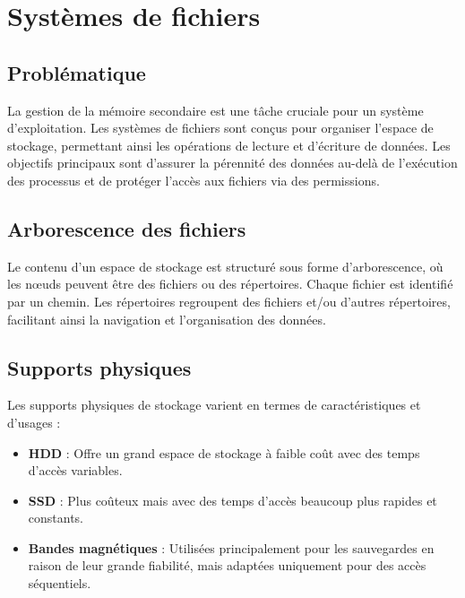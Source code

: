 \section{Systèmes de fichiers}\label{sec:systemesdefichiers}

\subsection{Problématique}
La gestion de la mémoire secondaire est une tâche cruciale pour un système d'exploitation. 
Les systèmes de fichiers sont conçus pour organiser l'espace de stockage, permettant ainsi les opérations de lecture et d'écriture de données. 
Les objectifs principaux sont d'assurer la pérennité des données au-delà de l'exécution des processus et de protéger l'accès aux fichiers via des permissions.

\subsection{Arborescence des fichiers}
Le contenu d'un espace de stockage est structuré sous forme d'arborescence, où les nœuds peuvent être des fichiers ou des répertoires. 
Chaque fichier est identifié par un chemin. 
Les répertoires regroupent des fichiers et/ou d'autres répertoires, facilitant ainsi la navigation et l'organisation des données.

\subsection{Supports physiques}
Les supports physiques de stockage varient en termes de caractéristiques et d'usages :
\begin{itemize}
    \item \textbf{HDD} : Offre un grand espace de stockage à faible coût avec des temps d'accès variables.
    \item \textbf{SSD} : Plus coûteux mais avec des temps d'accès beaucoup plus rapides et constants.
    \item \textbf{Bandes magnétiques} : Utilisées principalement pour les sauvegardes en raison de leur grande fiabilité, mais adaptées uniquement pour des accès séquentiels.
\end{itemize}

